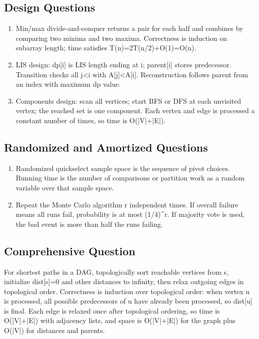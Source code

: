 \documentclass[11pt]{ctexart}
\begin{document}
\subsection*{Design Questions}
\begin{enumerate}
  \item Min/max divide-and-conquer returns a pair for each half and combines by comparing two minima and two maxima. Correctness is induction on subarray length; time satisfies T(n)=2T(n/2)+O(1)=O(n).
  \item LIS design: dp[i] is LIS length ending at i; parent[i] stores predecessor. Transition checks all j<i with A[j]<A[i]. Reconstruction follows parent from an index with maximum dp value.
  \item Components design: scan all vertices; start BFS or DFS at each unvisited vertex; the reached set is one component. Each vertex and edge is processed a constant number of times, so time is O(|V|+|E|).
\end{enumerate}

\subsection*{Randomized and Amortized Questions}
\begin{enumerate}
  \item Randomized quickselect sample space is the sequence of pivot choices. Running time is the number of comparisons or partition work as a random variable over that sample space.
  \item Repeat the Monte Carlo algorithm r independent times. If overall failure means all runs fail, probability is at most (1/4)\textasciicircum{}r. If majority vote is used, the bad event is more than half the runs failing.
\end{enumerate}

\subsection*{Comprehensive Question}
For shortest paths in a DAG, topologically sort reachable vertices from s, initialize dist[s]=0 and other distances to infinity, then relax outgoing edges in topological order. Correctness is induction over topological order: when vertex u is processed, all possible predecessors of u have already been processed, so dist[u] is final. Each edge is relaxed once after topological ordering, so time is O(|V|+|E|) with adjacency lists, and space is O(|V|+|E|) for the graph plus O(|V|) for distances and parents.
\end{document}
